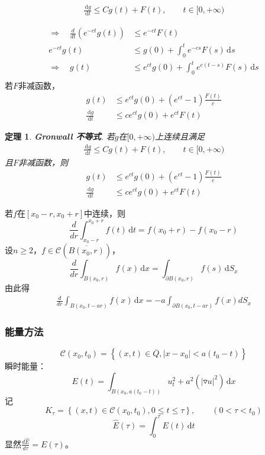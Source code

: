 \documentclass[11pt, a4paper]{article}
\theoremstyle{theorem}
\newtheorem{thm}{定理}[section]
\newcommand{\intd}[1]{\,\mathrm{d}{#1}}
\begin{document}
\begin{align*}
    \frac{\intd g}{\intd t} \leq C g(t) + F(t), \quad \quad t \in [0, +\infty)
\end{align*}

\begin{align*}
    \Longrightarrow \quad \frac{d}{d t} (e^{-ct} g(t)) &\leq e^{-ct } F(t) \\
    e^{-ct} g(t) &\leq g(0) + \int_0^t e^{-cs} F(s) \intd s \\
    \Longrightarrow \quad g(t) &\leq e^{ct} g(0)+\int_0^t e^{c(t - s)} F(s) \intd s \\
\end{align*}
若$F$非减函数，
\begin{align*}
    g(t) &\leq e^{ct} g(0) + (e^{ct} -1) \frac{F(t)}{c} \\
    \frac{\intd g}{\intd t} &\leq c e^{ct} g(0) + e^{ct} F(t)
\end{align*}

\begin{thm} \textbf{Gronwall 不等式}.
若$g$在$[0, +\infty)$上连续且满足
\begin{align}
    \frac{\intd g}{\intd t} \leq C g(t) + F(t), \quad \quad t \in [0, +\infty)
\end{align}
且$F$非减函数，则
\begin{align}
    g(t) &\leq e^{ct} g(0) + (e^{ct} -1) \frac{F(t)}{c} \\
    \frac{\intd g}{\intd t} &\leq c e^{ct} g(0) + e^{ct} F(t)
\end{align}
\end{thm}

若$f$在$[x_0 - r, x_0 + r]$中连续，则
$$
\frac{d}{d r} \int_{x_0 - r}^{x_0 + r} f(t) \intd t = f(x_0 + r) - f(x_0 - r)
$$
设$n \geq 2$，$f \in \mathcal{C}(\overline{B(x_0, r)})$，
$$
\frac{d}{d r} \int_{B(x_0, r)} f(x) \intd x = \int_{\partial B(x_0 ,r)} f(s) \intd S_x
$$
由此得
\begin{align}
\frac{d}{d r}\int_{B(x_0, t - ar)} f(x) \intd x = -a \int_{\partial B(x_0, t - ar)} f(x) d S_x
\end{align}

\subsubsection{能量方法}

$$
\mathcal{C}(x_0, t_0) = \left\{(x, t) \in \overline{Q}, |x - x_0| < a(t_0 - t)\right\}
$$
瞬时能量：
$$
E(t) = \int_{B(x_0, a(t_0 - t))} u_t^2 + a^2 (|\triangledown u|^2) \intd x
$$
记
$$
K_\tau = \left\{(x,t) \in \mathcal{C}(x_0, t_0), 0 \leq t \leq \tau \right\}, \quad \quad (0 < \tau < t_0)
$$
$$
\hat{E}(\tau) = \int_0^\tau E(t) \intd t
$$
显然$\frac{d \hat{E}}{d \tau} = E(\tau)$。
\end{document}
